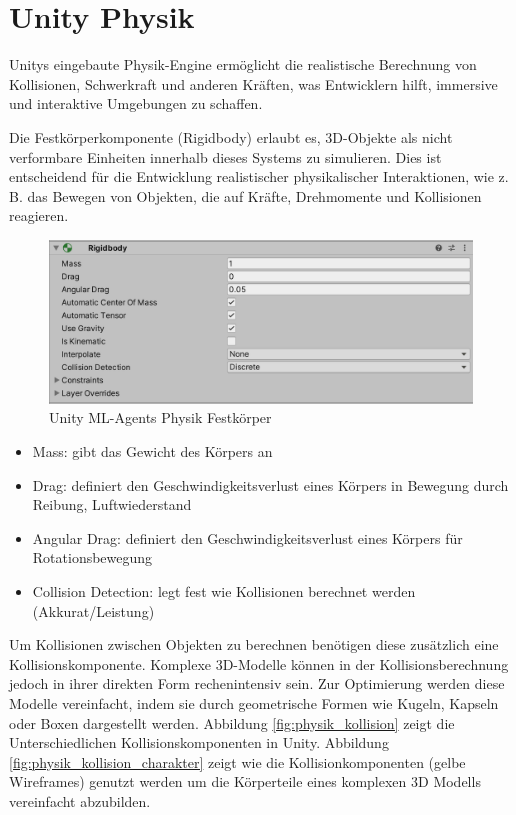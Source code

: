 \section{Unity Physik}
\label{sec:physik}
Unitys eingebaute Physik-Engine ermöglicht die realistische Berechnung von Kollisionen, Schwerkraft und anderen Kräften, was Entwicklern hilft, immersive und interaktive Umgebungen zu schaffen.

Die Festkörperkomponente (Rigidbody) erlaubt es, 3D-Objekte als nicht verformbare Einheiten innerhalb dieses Systems zu simulieren. Dies ist entscheidend für die Entwicklung realistischer physikalischer Interaktionen, wie z. B. das Bewegen von Objekten, die auf Kräfte, Drehmomente und Kollisionen reagieren.

\begin{figure}[H]
  \centering  
  \includegraphics[scale=0.5]{img/physik_festkoerper.png}
  \caption{Unity ML-Agents Physik Festkörper}
  \label{fig:physik_festkoerper}
\end{figure}
\begin{itemize}
  \item Mass: gibt das Gewicht des Körpers an
  \item Drag: definiert den Geschwindigkeitsverlust eines Körpers in Bewegung durch Reibung, Luftwiederstand
  \item Angular Drag: definiert den Geschwindigkeitsverlust eines Körpers für Rotationsbewegung
  \item Collision Detection: legt fest wie Kollisionen berechnet werden (Akkurat/Leistung)
 \end{itemize}
 
Um Kollisionen zwischen Objekten zu berechnen benötigen diese zusätzlich eine Kollisionskomponente. Komplexe 3D-Modelle können in der Kollisionsberechnung jedoch in ihrer direkten Form rechenintensiv sein. Zur Optimierung werden diese Modelle vereinfacht, indem sie durch geometrische Formen wie Kugeln, Kapseln oder Boxen dargestellt werden. Abbildung \ref{fig:physik_kollision} zeigt die Unterschiedlichen Kollisionskomponenten in Unity. Abbildung \ref{fig:physik_kollision_charakter} zeigt wie die Kollisionkomponenten (gelbe Wireframes) genutzt werden um die Körperteile eines komplexen 3D Modells vereinfacht abzubilden.

